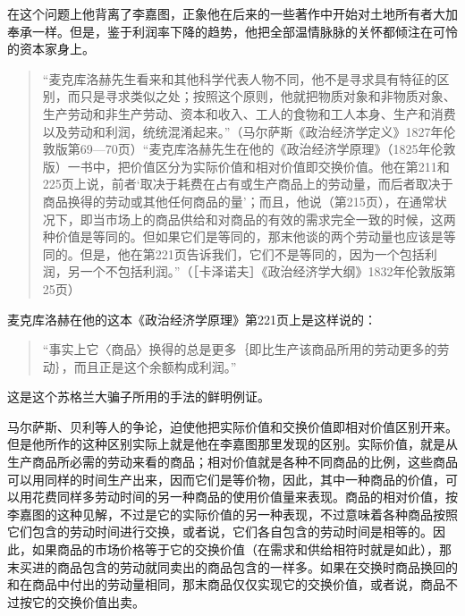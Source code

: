 在这个问题上他背离了李嘉图，正象他在后来的一些著作中开始对土地所有者大加奉承一样。但是，鉴于利润率下降的趋势，他把全部温情脉脉的关怀都倾注在可怜的资本家身上。

\begin{quote}{“麦克库洛赫先生看来和其他科学代表人物不同，他不是寻求具有特征的区别，而只是寻求类似之处；按照这个原则，他就把物质对象和非物质对象、生产劳动和非生产劳动、资本和收入、工人的食物和工人本身、生产和消费以及劳动和利润，统统混淆起来。”（马尔萨斯《政治经济学定义》1827年伦敦版第69—70页）“麦克库洛赫先生在他的《政治经济学原理》（1825年伦敦版）一书中，把价值区分为实际价值和相对价值即交换价值。他在第211和225页上说，前者‘取决于耗费在占有或生产商品上的劳动量，而后者取决于商品换得的劳动或其他任何商品的量’；而且，他说（第215页），在通常状况下，即当市场上的商品供给和对商品的有效的需求完全一致的时候，这两种价值是等同的。但如果它们是等同的，那末他谈的两个劳动量也应该是等同的。但是，他在第221页告诉我们，它们不是等同的，因为一个包括利润，另一个不包括利润。”（［卡泽诺夫］《政治经济学大纲》1832年伦敦版第25页）}\end{quote}

麦克库洛赫在他的这本《政治经济学原理》第221页上是这样说的：

\begin{quote}{“事实上它〈商品〉换得的总是更多｛即比生产该商品所用的劳动更多的劳动｝，而且正是这个余额构成利润。”}\end{quote}

这是这个苏格兰大骗子所用的手法的鲜明例证。

马尔萨斯、贝利等人的争论，迫使他把实际价值和交换价值即相对价值区别开来。但是他所作的这种区别实际上就是他在李嘉图那里发现的区别。实际价值，就是从生产商品所必需的劳动来看的商品；相对价值就是各种不同商品的比例，这些商品可以用同样的时间生产出来，因而它们是等价物，因此，其中一种商品的价值，可以用花费同样多劳动时间的另一种商品的使用价值量来表现。商品的相对价值，按李嘉图的这种见解，不过是它的实际价值的另一种表现，不过意味着各种商品按照它们包含的劳动时间进行交换，或者说，它们各自包含的劳动时间是相等的。因此，如果商品的市场价格等于它的交换价值（在需求和供给相符时就是如此），那末买进的商品包含的劳动就同卖出的商品包含的一样多。如果在交换时商品换回的和在商品中付出的劳动量相同，那末商品仅仅实现它的交换价值，或者说，商品不过按它的交换价值出卖。

